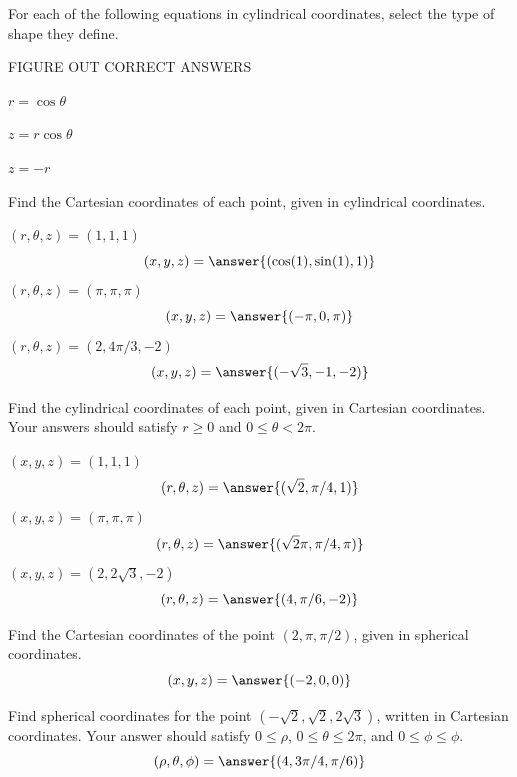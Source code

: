 \documentclass{ximera}
\begin{document}
\begin{problem}
For each of the following equations in cylindrical coordinates, select the type of shape they define.

FIGURE OUT CORRECT ANSWERS

$r = \cos\theta$
\begin{multipleChoice}
\end{multipleChoice}

$z = r\cos\theta$
\begin{multipleChoice}
\end{multipleChoice}

$z = -r$
\begin{multipleChoice}
\end{multipleChoice}
\end{problem}

\begin{problem}
Find the Cartesian coordinates of each point, given in cylindrical coordinates.

$(r,\theta,z) = (1,1,1)$
\[
(x,y,z) = \answer{(\cos(1), \sin(1), 1)}
\]
$(r,\theta,z) = (\pi,\pi,\pi)$
\[
(x,y,z) = \answer{(-\pi, 0, \pi)}
\]
$(r,\theta,z) = (2,4\pi/3,-2)$
\[
(x,y,z) = \answer{(-\sqrt{3}, -1, -2)}
\]
\end{problem}

\begin{problem}
Find the cylindrical coordinates of each point, given in Cartesian coordinates. Your answers should satisfy $r\geq 0$ and $0\leq \theta < 2\pi$.

$(x,y,z) = (1,1,1)$
\[
(r,\theta,z) = \answer{(\sqrt{2}, \pi/4, 1)}
\]
$(x,y,z) = (\pi,\pi,\pi)$
\[
(r,\theta,z) = \answer{(\sqrt{2}\pi, \pi/4, \pi)}
\]
$(x,y,z) = (2,2\sqrt{3},-2)$
\[
(r,\theta,z) = \answer{(4, \pi/6, -2)}
\]
\end{problem}

\begin{problem}
Find the Cartesian coordinates of the point $(2, \pi, \pi/2)$, given in spherical coordinates.
\[
(x,y,z) = \answer{(-2,0,0)}
\]
\end{problem}

\begin{problem}
Find spherical coordinates for the point $\left(-\sqrt{2}, \sqrt{2}, 2\sqrt{3}\right)$, written in Cartesian coordinates. Your answer should satisfy $0\leq \rho$, $0\leq \theta \leq 2\pi$, and $0\leq \phi \leq \phi$.
\[
(\rho, \theta, \phi) = \answer{(4, 3\pi/4, \pi/6)}
\]
\end{problem}
\end{document}
